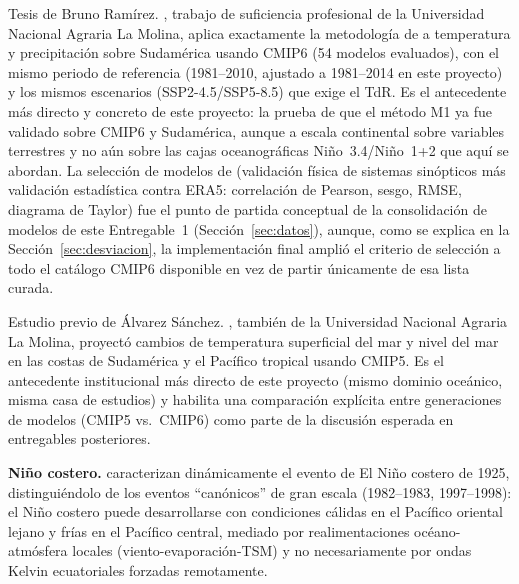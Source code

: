 \documentclass[11pt,a4paper]{article}
\begin{document}
Tesis de Bruno Ram\'irez. \citet{bruno2023}, trabajo de suficiencia profesional de la Universidad Nacional Agraria La Molina, aplica exactamente la metodolog\'ia de \citet{szabo2016} a temperatura y precipitaci\'on sobre Sudam\'erica usando CMIP6 (54 modelos evaluados), con el mismo periodo de referencia (1981--2010, ajustado a 1981--2014 en este proyecto) y los mismos escenarios (SSP2-4.5/SSP5-8.5) que exige el TdR. Es el antecedente m\'as directo y concreto de este proyecto: la prueba de que el m\'etodo M1 ya fue validado sobre CMIP6 y Sudam\'erica, aunque a escala continental sobre variables terrestres y no a\'un sobre las cajas oceanogr\'aficas Ni\~no~3.4/Ni\~no~1+2 que aqu\'i se abordan. La selecci\'on de modelos de \citet{bruno2023} (validaci\'on f\'isica de sistemas sin\'opticos m\'as validaci\'on estad\'istica contra ERA5: correlaci\'on de Pearson, sesgo, RMSE, diagrama de Taylor) fue el punto de partida conceptual de la consolidaci\'on de modelos de este Entregable~1 (Secci\'on~\ref{sec:datos}), aunque, como se explica en la Secci\'on~\ref{sec:desviacion}, la implementaci\'on final ampli\'o el criterio de selecci\'on a todo el cat\'alogo CMIP6 disponible en vez de partir \'unicamente de esa lista curada.

Estudio previo de \'Alvarez S\'anchez. \citet{alvarez2024}, tambi\'en de la Universidad Nacional Agraria La Molina, proyect\'o cambios de temperatura superficial del mar y nivel del mar en las costas de Sudam\'erica y el Pac\'ifico tropical usando CMIP5. Es el antecedente institucional m\'as directo de este proyecto (mismo dominio oce\'anico, misma casa de estudios) y habilita una comparaci\'on expl\'icita entre generaciones de modelos (CMIP5 vs.\ CMIP6) como parte de la discusi\'on esperada en entregables posteriores.

\textbf{Ni\~no costero.} \citet{takahashi2019} caracterizan din\'amicamente el evento de El Ni\~no costero de 1925, distingui\'endolo de los eventos ``can\'onicos'' de gran escala (1982--1983, 1997--1998): el Ni\~no costero puede desarrollarse con condiciones c\'alidas en el Pac\'ifico oriental lejano y fr\'ias en el Pac\'ifico central, mediado por realimentaciones oc\'eano-atm\'osfera locales (viento-evaporaci\'on-TSM) y no necesariamente por ondas Kelvin ecuatoriales forzadas remotamente.
\end{document}
